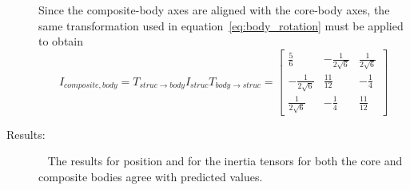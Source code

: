 \begin{description}
Since the composite-body axes are aligned with the core-body axes, the same
transformation used in equation~\ref{eq:body_rotation} must be applied to
obtain
 \begin{equation*}
I_{composite, body} = T_{struc \rightarrow body} I_{struc} T_{body \rightarrow
struc} =
 \begin{bmatrix}
 \frac{5}{6} & -\frac{1}{2\sqrt{6}} & \frac{1}{2\sqrt{6}}  \\
 -\frac{1}{2\sqrt{6}} & \frac{11}{12} & -\frac{1}{4}   \\
 \frac{1}{2\sqrt{6}} & -\frac{1}{4} & \frac{11}{12}
   \end{bmatrix}
\end{equation*}

\item[Results:]\ \newline
The results for position and for the inertia tensors for both the core and
composite bodies agree with predicted values.

\end{description}






